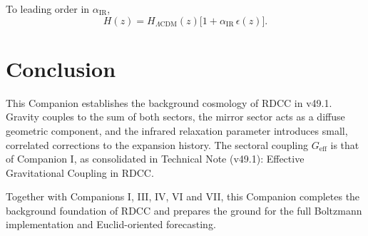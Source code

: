 \documentclass[11pt,a4paper]{article}
\begin{document}
To leading order in \(\alpha_{\mathrm{IR}}\),
\begin{equation}
  H(z)
  =
  H_{\Lambda\mathrm{CDM}}(z)
  \bigl[
    1 + \alpha_{\mathrm{IR}}\, \epsilon(z)
  \bigr].
\end{equation}

\section{Conclusion}

This Companion establishes the background cosmology of RDCC in v49.1.
Gravity couples to the sum of both sectors, the mirror sector acts as a
diffuse geometric component, and the infrared relaxation parameter
introduces small, correlated corrections to the expansion history. The
sectoral coupling \(G_{\mathrm{eff}}\) is that of Companion I, as
consolidated in Technical Note (v49.1): Effective Gravitational Coupling
in RDCC.

Together with Companions I, III, IV, VI and VII, this Companion completes
the background foundation of RDCC and prepares the ground for the full
Boltzmann implementation and Euclid-oriented forecasting.
\end{document}
